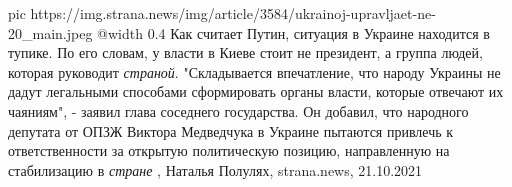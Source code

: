 \ifcmt
  pic https://img.strana.news/img/article/3584/ukrainoj-upravljaet-ne-20_main.jpeg
  @width 0.4
\fi
Как считает Путин, ситуация в Украине находится в тупике. По его словам, у
власти в Киеве стоит не президент, а группа людей, которая руководит \emph{страной}.
"Складывается впечатление, что народу Украины не дадут легальными способами
сформировать органы власти, которые отвечают их чаяниям", - заявил глава
соседнего государства.  Он добавил, что народного депутата от ОПЗЖ Виктора
Медведчука в Украине пытаются привлечь к ответственности за открытую
политическую позицию, направленную на стабилизацию в \emph{стране}
, 
Наталья Полулях, strana.news, 21.10.2021
